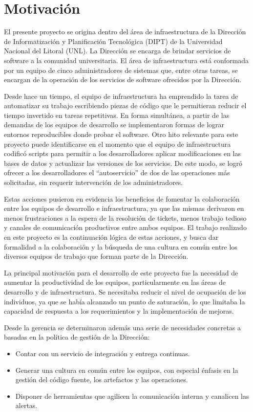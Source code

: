 \section{Motivación}

El presente proyecto se origina dentro del área de infraestructura de
la Dirección de Informatización y Planificación Tecnológica (DIPT) de
la Universidad Nacional del Litoral (UNL). La Dirección se encarga de
brindar servicios de software a la comunidad universitaria. El área de
infraestructura está conformada por un equipo de cinco administradores
de sistemas que, entre otras tareas, se encargan de la operación de
los servicios de software ofrecidos por la Dirección.

Desde hace un tiempo, el equipo de infraestructura ha emprendido la
tarea de automatizar su trabajo escribiendo piezas de código que le
permitieran reducir el tiempo invertido en tareas repetitivas. En
forma simultánea, a partir de las demandas de los equipos de
desarrollo se implementaron formas de lograr entornos reproducibles
donde probar el software. Otro hito relevante para este proyecto puede
identificarse en el momento que el equipo de infraestructura codificó
scripts para permitir a los desarrolladores aplicar modificaciones en
las bases de datos y actualizar las versiones de los servicios. De
este modo, se logró ofrecer a los desarrolladores el “autoservicio” de
dos de las operaciones más solicitadas, sin requerir intervención de
los administradores.

Estas acciones pusieron en evidencia los beneficios de fomentar la
colaboración entre los equipos de desarrollo e infraestructura, ya que
las mismas derivaron en menos frustraciones a la espera de la
resolución de tickets, menos trabajo tedioso y canales de comunicación
productivos entre ambos equipos. El trabajo realizado en este proyecto
es la continuación lógica de estas acciones, y busca dar formalidad a
la colaboración y la búsqueda de una cultura en común entre los
diversos equipos de trabajo que forman parte de la Dirección.

La principal motivación para el desarrollo de este proyecto fue la
necesidad de aumentar la productividad de los equipos, particularmente
en las áreas de desarrollo y de infraestructura. Se necesitaba reducir
el nivel de ocupación de los individuos, ya que se había alcanzado un
punto de saturación, lo que limitaba la capacidad de respuesta a los
requerimientos y la implementación de mejoras.

Desde la gerencia se determinaron además una serie de necesidades
concretas a basadas en la política de gestión de la Dirección:

\begin{itemize}
\item Contar con un servicio de integración y entrega continuas.
\item Generar una cultura en común entre los equipos, con especial
  énfasis en la gestión del código fuente, los artefactos y las
  operaciones.
\item Disponer de herramientas que agilicen la comunicación interna y
  canalicen las alertas.
\end{itemize}
